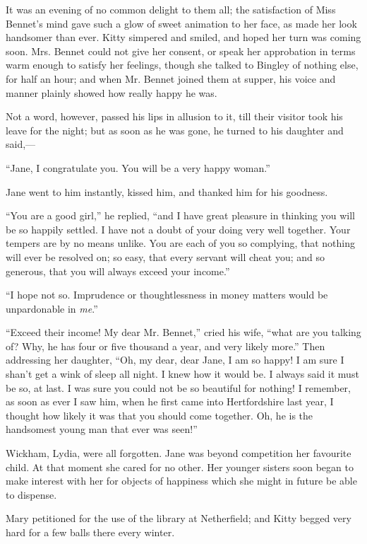 \documentclass[12pt,openright]{book}
\begin{document}
It was an evening of no common delight to them all; the satisfaction of Miss Bennet’s mind gave such a glow of sweet animation to her face, as made her look handsomer than ever. Kitty simpered and smiled, and hoped her turn was coming soon. Mrs. Bennet could not give her consent, or speak her approbation in terms warm enough to satisfy her feelings, though she talked to Bingley of nothing else, for half an hour; and when Mr. Bennet joined them at supper, his voice and manner plainly showed how really happy he was.

Not a word, however, passed his lips in allusion to it, till their visitor took his leave for the night; but as soon as he was gone, he turned to his daughter and said,—

“Jane, I congratulate you. You will be a very happy woman.”

Jane went to him instantly, kissed him, and thanked him for his goodness.

“You are a good girl,” he replied, “and I have great pleasure in thinking you will be so happily settled. I have not a doubt of your doing very well together. Your tempers are by no means unlike. You are each of you so complying, that nothing will ever be resolved on; so easy, that every servant will cheat you; and so generous, that you will always exceed your income.”

“I hope not so. Imprudence or thoughtlessness in money matters would be unpardonable in \textit{me}.”

“Exceed their income! My dear Mr. Bennet,” cried his wife, “what are you talking of? Why, he has four or five thousand a year, and very likely more.” Then addressing her daughter, “Oh, my dear, dear Jane, I am so happy! I am sure I shan’t get a wink of sleep all night. I knew how it would be. I always said it must be so, at last. I was sure you could not be so beautiful for nothing! I remember, as soon as ever I saw him, when he first came into Hertfordshire last year, I thought how likely it was that you should come together. Oh, he is the handsomest young man that ever was seen!”

Wickham, Lydia, were all forgotten. Jane was beyond competition her favourite child. At that moment she cared for no other. Her younger sisters soon began to make interest with her for objects of happiness which she might in future be able to dispense.

Mary petitioned for the use of the library at Netherfield; and Kitty begged very hard for a few balls there every winter.
\end{document}
